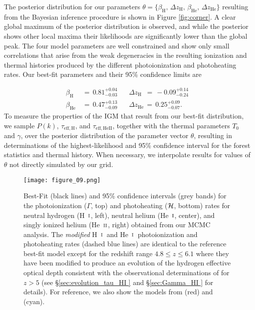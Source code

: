 \documentclass[twocolumn]{aastex62}
\def\HI{\hbox{\rm H~$\scriptstyle\rm I$}}
\def\HeI{\hbox{He~$\scriptstyle\rm I$}}
\def\HeII{\hbox{He~$\scriptstyle\rm II$}}
\newcommand\taueffHn{$\tau_{\mathrm{eff,H}}$}
\newcommand\taueffHen{$\tau_{\mathrm{eff,HeII}}$}
\begin{document}
The posterior distribution for our parameters $\theta= \{ \beta_{\mathrm{H}}, \,\Delta z_{\mathrm{H}}, \, \beta_{\mathrm{He}}, \,\Delta z_{\mathrm{He}} \} $
resulting from the Bayesian inference procedure is shown in Figure \ref{fig:corner}. 
A clear global maximum of the 
posterior distribution is observed, and while the posterior shows other local maxima their likelihoods are significantly 
lower than the global peak.   
The four model parameters are well constrained and show only small correlations that arise  
from the weak degeneracies in the resulting ionization and thermal histories produced by the different photoionization and photoheating rates. 
Our best-fit parameters and their 95\% confidence limits are


\begin{equation}
\begin{aligned}
\beta_{\mathrm{H}} \,  &= \, 0.81^{+0.04}_{-0.03}  \,\,\,\,\,\,\,\,\,\,  \Delta z_{\mathrm{H}}  \,\, \,=\, -0.09^{+0.14}_{-0.24}\\ 
\beta_{\mathrm{He}} \, &= \, 0.47^{+0.13}_{-0.09}  \,\,\,\,\,\,\,\,\,\, \Delta z_{\mathrm{He}} \, =\,  0.25^{+0.09}_{-0.07}.
\end{aligned}
\label{eq:parameter_constraints}
\end{equation}    
%
To measure the properties of the IGM that result from our best-fit distribution, we sample $P(k)$, \taueffHn, and \taueffHen, together with the thermal parameters $T_0$ and $\gamma$, over the posterior distribution of the parameter vector $\theta$, 
resulting in determinations of the highest-likelihood and 95\% confidence interval for the forest statistics and thermal history. When necessary, we interpolate results for values of 
$\theta$ not directly simulated by our grid.

\begin{figure*}
\texttt{[image: figure\_09.png]}
\caption{Best-Fit (black lines) and 95\% confidence intervals (grey bands) for the photoionization ($\Gamma$, top) and photoheating ($\cal{H}$, bottom) rates for neutral 
hydrogen (\HI, left), neutral helium (\HeI, center), and singly ionized helium (\HeII, right) obtained from our MCMC analysis.
The \textit{modified} \HI\ and \HeI\ photoionization 
and photoheating rates (dashed blue lines) are identical to the reference best-fit model except for the redshift range $ 4.8 \leq z \leq 6.1$ where they have been modified to 
produce an evolution of the hydrogen effective optical depth consistent with the observational determinations of \cite{Bosman_2018} for $z>5$ 
(see \S \ref{sec:evolution_tau_HI } and \S \ref{sec:Gamma_HI } for details).
For reference, we also show the models from \cite{puchwein2019a} (red) and \cite{haardt2012a} (cyan). }
\label{fig:uvb_result}
\end{figure*}
\end{document}
